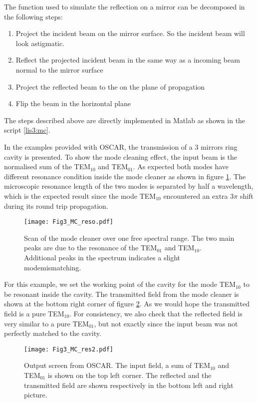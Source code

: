 The function used to simulate the reflection on a mirror can be decomposed in the following steps:
\begin{enumerate}
  \item Project the incident beam on the mirror surface. So the incident beam will look astigmatic.
  \item Reflect the projected incident beam in the same way as a incoming beam normal to the mirror surface
  \item Project the reflected beam to the on the plane of propagation
  \item Flip the beam in the horizontal plane
\end{enumerate}

The steps described above are directly implemented in Matlab as shown in the script \ref{lis3:mc}.

In the examples provided with OSCAR, the transmission of a 3 mirrors ring cavity is presented. To show the mode cleaning effect, the input beam is the normalised sum of the TEM$_{10}$ and TEM$_{01}$. As expected both modes have different resonance condition inside the mode cleaner as shown in figure \ref{fig3:MC_reso}. The microscopic resonance length of the two modes is separated by half a wavelength, which is the expected result since the mode TEM$_{10}$ encountered an extra $3\pi$ shift during its round trip propagation.


\begin{figure}
\begin{center}
\texttt{[image: Fig3\_MC\_reso.pdf]}
\end{center}
\caption{Scan of the mode cleaner over one free spectral range. The two main peaks are due to the resonance of the TEM$_{01}$ and TEM$_{10}$. Additional peaks in the spectrum indicates a slight modemismatching. \label{fig3:MC_reso}}
\end{figure}


For this example, we set the working point of the cavity for the mode TEM$_{10}$ to be resonant inside the cavity. The transmitted field from the mode cleaner is shown at the bottom right corner of figure \ref{fig3:MC_res}. As we would hope the transmitted field is a pure TEM$_{10}$. For consistency, we also check that the reflected field is very similar to a pure TEM$_{01}$, but not exactly since the input beam was not perfectly matched to the cavity.

\begin{figure}
\begin{center}
\texttt{[image: Fig3\_MC\_res2.pdf]}
\end{center}
\caption{Output screen from OSCAR. The input field, a sum of TEM$_{10}$ and TEM$_{01}$ is shown on the top left corner. The reflected and the transmitted field are shown respectively in the bottom left and right picture.  \label{fig3:MC_res}}
\end{figure}

